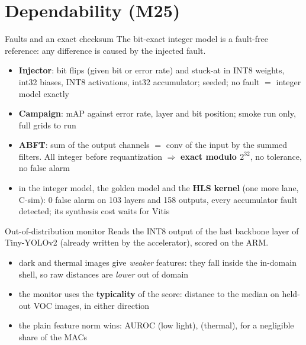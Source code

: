 \documentclass[aspectratio=169,11pt]{beamer}
\begin{document}
\section{Dependability (M25)}

\begin{frame}{Faults and an exact checksum}
  \small
  The bit-exact integer model is a fault-free reference: any difference is caused by the
  injected fault.
  \begin{itemize}
    \item \textbf{Injector}: bit flips (given bit or error rate) and stuck-at in INT8
      weights, int32 biases, INT8 activations, int32 accumulator; seeded; no fault $=$
      integer model exactly
    \item \textbf{Campaign}: mAP against error rate, layer and bit position; smoke run only,
      full grids to run
    \item \textbf{ABFT}: sum of the output channels $=$ conv of the input by the summed
      filters. All integer before requantization $\Rightarrow$ \textbf{exact modulo
      $2^{32}$}, no tolerance, no false alarm
    \item in the integer model, the golden model and the \textbf{HLS kernel} (one more
      lane, C-sim): 0 false alarm on 103 layers and 158 outputs, every accumulator fault
      detected; its synthesis cost waits for Vitis
  \end{itemize}
\end{frame}

\begin{frame}{Out-of-distribution monitor}
  \footnotesize
  Reads the INT8 output of the last backbone layer of Tiny-YOLOv2 (already written by the
  accelerator), scored on the ARM.
  \begin{itemize}
    \item dark and thermal images give \emph{weaker} features: they fall inside the
      in-domain shell, so raw distances are \emph{lower} out of domain
    \item the monitor uses the \textbf{typicality} of the score: distance to the median on
      held-out VOC images, in either direction
    \item the plain feature norm wins: AUROC  (low light),
      \textbf{} (thermal), for a negligible share of the MACs
  \end{itemize}
  \medskip
  \scriptsize{}
\end{frame}
\end{document}
